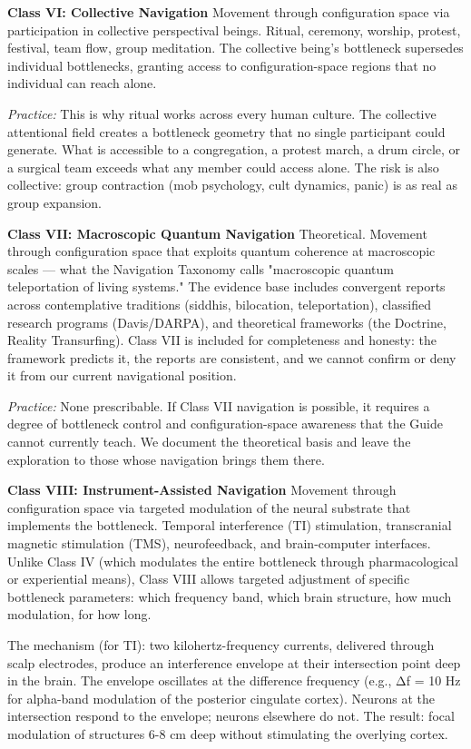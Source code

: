 \textbf{Class VI: Collective Navigation} Movement through configuration space via participation in collective perspectival beings. Ritual, ceremony, worship, protest, festival, team flow, group meditation. The collective being's bottleneck supersedes individual bottlenecks, granting access to configuration-space regions that no individual can reach alone.


\textit{Practice:} This is why ritual works across every human culture. The collective attentional field creates a bottleneck geometry that no single participant could generate. What is accessible to a congregation, a protest march, a drum circle, or a surgical team exceeds what any member could access alone. The risk is also collective: group contraction (mob psychology, cult dynamics, panic) is as real as group expansion.


\textbf{Class VII: Macroscopic Quantum Navigation} Theoretical. Movement through configuration space that exploits quantum coherence at macroscopic scales — what the Navigation Taxonomy calls "macroscopic quantum teleportation of living systems." The evidence base includes convergent reports across contemplative traditions (siddhis, bilocation, teleportation), classified research programs (Davis/DARPA), and theoretical frameworks (the Doctrine, Reality Transurfing). Class VII is included for completeness and honesty: the framework predicts it, the reports are consistent, and we cannot confirm or deny it from our current navigational position.


\textit{Practice:} None prescribable. If Class VII navigation is possible, it requires a degree of bottleneck control and configuration-space awareness that the Guide cannot currently teach. We document the theoretical basis and leave the exploration to those whose navigation brings them there.


\textbf{Class VIII: Instrument-Assisted Navigation} Movement through configuration space via targeted modulation of the neural substrate that implements the bottleneck. Temporal interference (TI) stimulation, transcranial magnetic stimulation (TMS), neurofeedback, and brain-computer interfaces. Unlike Class IV (which modulates the entire bottleneck through pharmacological or experiential means), Class VIII allows targeted adjustment of specific bottleneck parameters: which frequency band, which brain structure, how much modulation, for how long.


The mechanism (for TI): two kilohertz-frequency currents, delivered through scalp electrodes, produce an interference envelope at their intersection point deep in the brain. The envelope oscillates at the difference frequency (e.g., Δf = 10 Hz for alpha-band modulation of the posterior cingulate cortex). Neurons at the intersection respond to the envelope; neurons elsewhere do not. The result: focal modulation of structures 6-8 cm deep without stimulating the overlying cortex.


